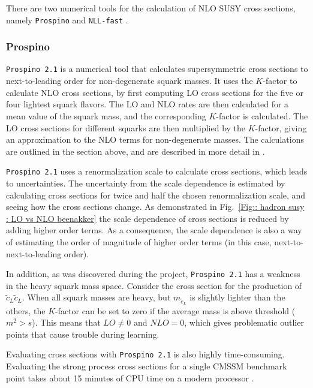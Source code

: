 \documentclass[twoside,english]{uiofysmaster}
\begin{document}
{There are two numerical tools for the calculation of NLO SUSY cross sections, namely \verb|Prospino| \cite{beenakker1996prospino} and \verb|NLL-fast| \cite{beenakker2016nlo+}.

\subsubsection{Prospino}\label{Sec:: susy hadron : Prospino}
\verb|Prospino 2.1| \cite{beenakker1996prospino} is a numerical tool that calculates supersymmetric cross sections to next-to-leading order for non-degenerate squark masses. It uses the $K$-factor to calculate NLO cross sections, by first computing LO cross sections for the five or four lightest squark flavors. The LO and NLO rates are then calculated for a mean value of the squark mass, and the corresponding $K$-factor is calculated. The LO cross sections for different squarks are then multiplied by the $K$-factor, giving an approximation to the NLO terms for non-degenerate masses. The calculations are outlined in the section above, and are described in more detail in \cite{beenakker1996prospino}. 

\verb|Prospino 2.1| uses a renormalization scale to calculate cross sections, which leads to uncertainties. The uncertainty from the scale dependence is estimated by calculating cross sections for twice and half the chosen renormalization scale, and seeing how the cross sections change. As demonstrated in Fig.~\ref{Fig:: hadron susy : LO vs NLO beenakker} the scale dependence of cross sections is reduced by adding higher order terms. As a consequence, the scale dependence is also a way of estimating the order of magnitude of higher order terms (in this case, next-to-next-to-leading order). 


In addition, as was discovered during the project, \verb|Prospino 2.1| has a weakness in the heavy squark mass space. Consider the cross section for the production of $\widetilde{c}_L \widetilde{c}_L$. When all squark masses are heavy, but $m_{\widetilde{c}_L}$ is slightly lighter than the others, the $K$-factor can be set to zero if the average mass is above threshold ($m^2 > s$). This means that $LO \neq 0$ and $NLO =0$, which gives problematic outlier points that cause trouble during learning.

Evaluating cross sections with \verb|Prospino 2.1| is also highly time-consuming. Evaluating the strong process cross sections for a single CMSSM benchmark point takes about 15 minutes of CPU time on a modern processor \cite{balazs2017colliderbit}. 


}
\end{document}
